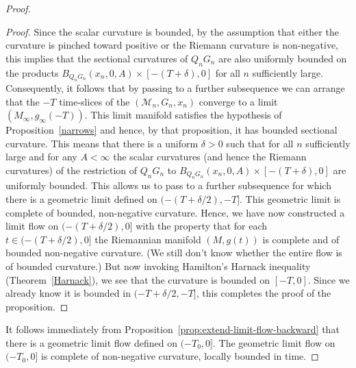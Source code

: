 \begin{proof}
\begin{proof}
Since the scalar curvature is bounded, by the assumption that either
the curvature is pinched toward positive or the Riemann curvature is
non-negative, this implies that the sectional curvatures of $Q_nG_n$
are also uniformly bounded on the products
$B_{Q_nG_n}(x_n,0,A)\times [-(T+\delta),0]$ for all $n$ sufficiently
large. Consequently, it follows that by passing to a further
subsequence we can arrange that the $-T$ time-slices of the
$({\mathcal M}_n,G_n,x_n)$ converge to a limit
$(M_\infty,g_\infty(-T))$.
 This limit manifold
satisfies the hypothesis of Proposition~\ref{narrows} and hence, by
that proposition, it has bounded sectional curvature. This means
that there is a uniform $\delta>0$ such that for all $n$
sufficiently large and for any $A<\infty$ the scalar curvatures (and
hence the Riemann curvatures) of the restriction of $Q_nG_n$ to
$B_{Q_nG_n}(x_n,0,A)\times [-(T+\delta),0]$ are uniformly bounded.
This allows us to pass to a further subsequence for which there is a
geometric limit defined on $(-(T+\delta/2),-T]$. This geometric
limit is complete of  bounded, non-negative curvature. Hence, we
have now constructed a limit flow on $(-(T+\delta/2),0]$ with the
property that for each $t\in (-(T+\delta/2),0]$ the Riemannian
manifold $(M,g(t))$ is complete and of bounded non-negative
curvature. (We still don't know whether the entire flow is of
bounded curvature.) But now invoking Hamilton's Harnack inequality
(Theorem~\ref{Harnack}), we see that the curvature is bounded on
$[-T,0]$. Since we already know it is bounded in $(-T+\delta/2,-T]$,
this completes the proof of the proposition.
\end{proof}

 It follows immediately from Proposition~\ref{prop:extend-limit-flow-backward} that there is a
geometric  limit flow defined on  $(-T_0,0]$. The geometric limit
flow on $(-T_0,0]$ is complete of non-negative curvature, locally
bounded in time.




\end{proof}
